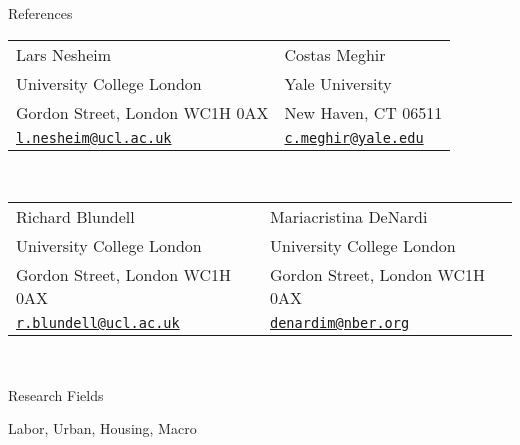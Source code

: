 \documentclass{cvjobmarket} %
\begin{document}

\begin{rSection}{References}

\begin{tabularx}{\textwidth}{p{}X}
Lars Nesheim                                             & Costas Meghir \\
University College London                                & Yale University \\
Gordon Street, London WC1H 0AX                           & New Haven, CT 06511 \\
\href{mailto:l.nesheim@ucl.ac.uk}{\texttt{l.nesheim@ucl.ac.uk}}   & \href{mailto:c.meghir@yale.edu}{\texttt{c.meghir@yale.edu}}\\
\end{tabularx}\\

\bigskip

\begin{tabularx}{\textwidth}{p{}X}
Richard Blundell                                         & Mariacristina DeNardi\\
University College London                                & University College London\\
Gordon Street, London WC1H 0AX                           & Gordon Street, London WC1H 0AX   \\
\href{mailto:r.blundell@ucl.ac.uk}{\texttt{r.blundell@ucl.ac.uk}} &\href{mailto:denardim@nber.org}{\texttt{denardim@nber.org}}\\
\end{tabularx}\\

\end{rSection}









\begin{rSection}{Research Fields}

{Labor, Urban, Housing, Macro}\\ 

\end{rSection}
\end{document}
